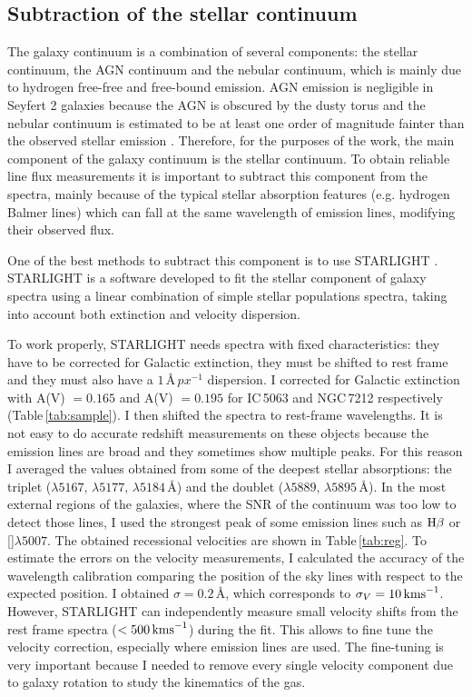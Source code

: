 \documentclass[../main.tex]{subfiles}
\begin{document}
\subsection{Subtraction of the stellar continuum}
\label{sec:starcont}


The galaxy continuum is a combination of several components: the stellar continuum, the AGN continuum and the nebular continuum, which is mainly due to hydrogen free-free and free-bound emission.
AGN emission is negligible in Seyfert 2 galaxies because the AGN is obscured by the dusty torus \citep[e.g.][]{Beckmann12} and the nebular continuum is estimated to be at least one order of magnitude fainter than the observed stellar emission \citep{OsterbrockAGN89}.
Therefore, for the purposes of the work, the main component of the galaxy continuum is the stellar continuum.
To obtain reliable line flux measurements it is important to subtract this component from the spectra, mainly because of the typical stellar absorption features (e.g. hydrogen Balmer lines) which can fall at the same wavelength of emission lines, modifying their observed flux.

One of the best methods to subtract this component is to use STARLIGHT \citep{Fernandes05, Mateus06, Fernandes07}.
STARLIGHT is a software developed to fit the stellar component of galaxy spectra using a linear combination of simple stellar populations spectra, taking into account both extinction and velocity dispersion.

To work properly, STARLIGHT needs spectra with fixed characteristics: they have to be corrected for Galactic extinction, they must be shifted to rest frame and they must also have a $1\,\si{\angstrom\,px^{-1}}$ dispersion.
I corrected for Galactic extinction with A(V) $= 0.165$ and A(V) $=0.195$ \citep{Schlafly11} for IC\,5063 and NGC\,7212 respectively (Table\,\ref{tab:sample}). 
I then shifted the spectra to rest-frame wavelengths.
It is not easy to do accurate redshift measurements on these objects because the emission lines are broad and they sometimes show multiple peaks. 
For this reason I averaged the values obtained from some of the deepest stellar absorptions: the  triplet ($\lambda5167,\,\lambda5177,\,\lambda5184$\,\AA) and the  doublet ($\lambda5889,\,\lambda5895$\,\AA).
In the most external regions of the galaxies, where the SNR of the continuum was too low to detect those lines, I used the strongest peak of some emission lines such as $\Hb$ or []$\lambda5007$.
The obtained recessional velocities are shown in Table\,\ref{tab:reg}.
To estimate the errors on the velocity measurements, I calculated the accuracy of the wavelength calibration comparing the position of the sky lines with respect to the expected position.
I obtained $\sigma = 0.2\,\si{\angstrom}$, which corresponds to $\sigma_V=10\,\si{\kms}$.
However, STARLIGHT can independently measure small velocity shifts from the rest frame spectra ($< 500\,\si{\kms}$) during the fit.
This allows to fine tune the velocity correction, especially where emission lines are used.
The fine-tuning is very important because I needed to remove every single velocity component due to galaxy rotation to study the kinematics of the gas.
\end{document}

